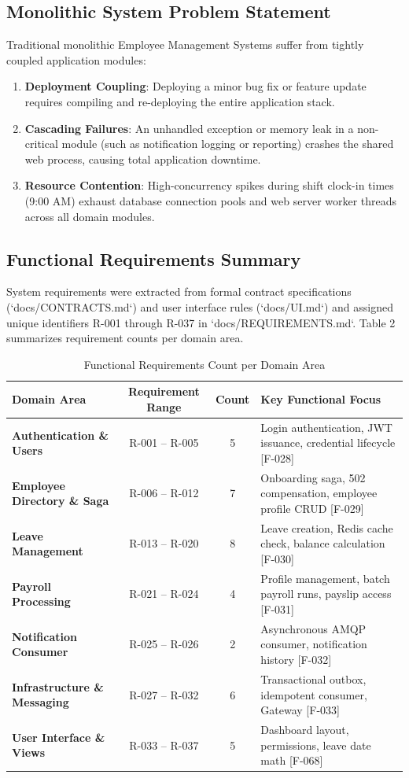 \documentclass[11pt,a4paper]{article}
\begin{document}
\subsection{Monolithic System Problem Statement}
Traditional monolithic Employee Management Systems suffer from tightly coupled application modules:
\begin{enumerate}
    \item \textbf{Deployment Coupling}: Deploying a minor bug fix or feature update requires compiling and re-deploying the entire application stack.
    \item \textbf{Cascading Failures}: An unhandled exception or memory leak in a non-critical module (such as notification logging or reporting) crashes the shared web process, causing total application downtime.
    \item \textbf{Resource Contention}: High-concurrency spikes during shift clock-in times (9:00 AM) exhaust database connection pools and web server worker threads across all domain modules.
\end{enumerate}

\subsection{Functional Requirements Summary}
System requirements were extracted from formal contract specifications (`docs/CONTRACTS.md`) and user interface rules (`docs/UI.md`) and assigned unique identifiers R-001 through R-037 in `docs/REQUIREMENTS.md`. Table 2 summarizes requirement counts per domain area.

\begin{table}[htbp]
\caption{Functional Requirements Count per Domain Area}
\centering
\begin{tabularx}{\linewidth}{X c c X}
\toprule
\textbf{Domain Area} & \textbf{Requirement Range} & \textbf{Count} & \textbf{Key Functional Focus} \\
\midrule
\textbf{Authentication \& Users} & R-001 -- R-005 & 5 & Login authentication, JWT issuance, credential lifecycle [F-028] \\
\textbf{Employee Directory \& Saga} & R-006 -- R-012 & 7 & Onboarding saga, 502 compensation, employee profile CRUD [F-029] \\
\textbf{Leave Management} & R-013 -- R-020 & 8 & Leave creation, Redis cache check, balance calculation [F-030] \\
\textbf{Payroll Processing} & R-021 -- R-024 & 4 & Profile management, batch payroll runs, payslip access [F-031] \\
\textbf{Notification Consumer} & R-025 -- R-026 & 2 & Asynchronous AMQP consumer, notification history [F-032] \\
\textbf{Infrastructure \& Messaging} & R-027 -- R-032 & 6 & Transactional outbox, idempotent consumer, Gateway [F-033] \\
\textbf{User Interface \& Views} & R-033 -- R-037 & 5 & Dashboard layout, permissions, leave date math [F-068] \\
\bottomrule
\end{tabularx}
\end{table}
\end{document}
